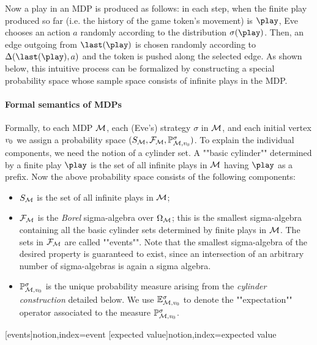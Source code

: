 Now a play in an MDP is produced as follows: in each step, when the finite play produced so far (i.e. the history of the game token's movement) is $\play$, Eve chooses an action $a$ randomly according to the distribution $\sigma(\play)$. Then, an edge outgoing from $\last(\play)$ is chosen randomly according to $\probTranFunc(\last(\play),a)$ and the token is pushed along the selected edge. As shown below, this intuitive process can be formalized by constructing a special probability space whose sample space consists of infinite plays in the MDP. 




\paragraph{Formal semantics of MDPs}

Formally, to each MDP $\mathcal{M}$, each (Eve's) strategy $\sigma$ in $\mathcal{M}$, and 
each initial vertex $v_0$ we assign a probability space 
$(S_{\mathcal{M}},\mathcal{F}_{\mathcal{M}},\mathbb{P}^{\sigma}_{\mathcal{M},v_0})$. To 
explain the individual components, we need the notion of a cylinder set. A 
""basic cylinder"" determined by a finite play $\play$ is the set of 
all infinite plays in $\mathcal{M}$ having $\play$ as a prefix. Now the above 
probability space consists of the following components:
\begin{itemize}
	\item $S_{\mathcal{M}}$ is the set of all infinite plays in $\mathcal{M}$;
	\item $\mathcal{F}_{\mathcal{M}}$ is the \emph{Borel} sigma-algebra over 
	$\Omega_{\mathcal{M}}$; this is the smallest sigma-algebra containing all the 
	basic cylinder sets determined by finite plays in $\mathcal{M}$. The sets in 
	$\mathcal{F}_{\mathcal{M}}$ are called ""events"". Note that the smallest sigma-algebra of the desired property is guaranteed to exist, since an intersection of an arbitrary number of sigma-algebras is again a sigma algebra.
	\item $\mathbb{P}^{\sigma}_{\mathcal{M},v_0}$ is the unique probability measure 
	arising from the \emph{cylinder construction} detailed below. We use 
	$\mathbb{E}^{\sigma}_{\mathcal{M},v_0}$ to denote the ""expectation"" operator 
	associated to the measure $\mathbb{P}^{\sigma}_{\mathcal{M},v_0}$.
\end{itemize}
[events]{notion,index={event}}
[expected value]{notion,index={expected value}}





